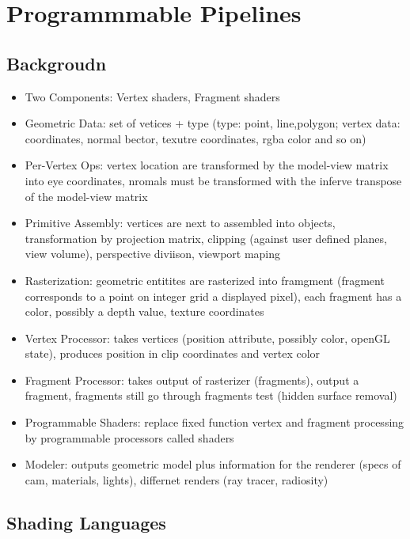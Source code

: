 \documentclass[11pt,a4paper]{article}
\begin{document}
\section{Programmmable Pipelines}
	\subsection{Backgroudn}
	\begin{itemize}
		\item Two Components: Vertex shaders, Fragment shaders
		\item Geometric Data: set of vetices + type (type: point, line,polygon; vertex data: coordinates, normal bector, texutre coordinates, rgba color and so on)
		\item Per-Vertex Ops: vertex location are transformed by the model-view matrix into eye coordinates, nromals must be transformed with the inferve transpose of the model-view matrix
		\item Primitive Assembly: vertices are next to assembled into objects, transformation by projection matrix, clipping (against user defined planes, view volume), perspective diviison, viewport maping
		\item Rasterization: geometric entitites are rasterized into framgment (fragment corresponds to a point on integer grid a displayed pixel), each fragment has a color, possibly a depth value, texture coordinates
		\item Vertex Processor: takes vertices (position attribute, possibly color, openGL state), produces position in clip coordinates and vertex color
		\item Fragment Processor: takes output of rasterizer (fragments), output a fragment, fragments still go through fragments test (hidden surface removal)
		\item Programmable Shaders: replace fixed function vertex and fragment processing by programmable processors called shaders
		\item Modeler: outputs geometric model plus information for the renderer (specs of cam, materials, lights), differnet renders (ray tracer, radiosity)
	\end{itemize}
	\subsection{Shading Languages}
\end{document}
